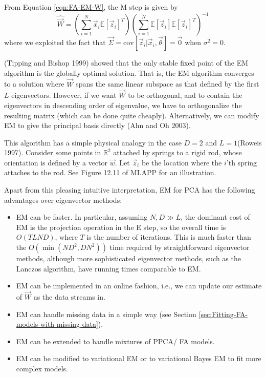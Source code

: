 From Equation \ref{eqn:FA-EM-W}, the M step is given by
\begin{equation}
\hat{\vec{W}}=\left(\sum\limits_{i=1}^N \vec{x}_i\mathbb{E}[\vec{z}_i]^T\right)\left(\sum\limits_{i=1}^N \mathbb{E}[\vec{z}_i]\mathbb{E}[\vec{z}_i]^T\right)^{-1}
\end{equation}
where we exploited the fact that $\vec{\Sigma}=\mathrm{cov}[\vec{z}_i|\vec{x}_i,\vec{\theta}]=\vec{0}$ when $\sigma^2=0$.

(Tipping and Bishop 1999) showed that the only stable fixed point of the EM algorithm is the globally optimal solution. That is, the EM algorithm converges to a solution where $\vec{W}$ spans the same linear subspace as that defined by the first $L$ eigenvectors. However, if we want $\vec{W}$ to be orthogonal, and to contain the eigenvectors in descending order of eigenvalue, we have to orthogonalize the resulting matrix (which can be done quite cheaply). Alternatively, we can modify EM to give the principal basis directly (Ahn and Oh 2003).

This algorithm has a simple physical analogy in the case $D=2$ and $L=1$(Roweis 1997). Consider some points in $\mathbb{R}^2$ attached by springs to a rigid rod, whose orientation is defined by a vector $\vec{w}$. Let $\vec{z}_i$ be the location where the $i$'th spring attaches to the rod. See Figure 12.11 of MLAPP for an illustration.

Apart from this pleasing intuitive interpretation, EM for PCA has the following advantages over eigenvector methods:
\begin{itemize}
\item{EM can be faster. In particular, assuming $N,D \gg L$, the dominant cost of EM is the projection operation in the E step, so the overall time is $O(TLND)$, where $T$ is the number of iterations. This is much faster than the $O(\min(ND^2,DN^2))$ time required by straightforward eigenvector methods, although more sophisticated eigenvector methods, such as the Lanczos algorithm, have running times comparable to EM.}
\item{EM can be implemented in an online fashion, i.e., we can update our estimate of $\vec{W}$ as the data streams in.}
\item{EM can handle missing data in a simple way (see Section \ref{sec:Fitting-FA-models-with-missing-data}).}
\item{EM can be extended to handle mixtures of PPCA/ FA models.}
\item{EM can be modified to variational EM or to variational Bayes EM to fit more complex models.}
\end{itemize}


